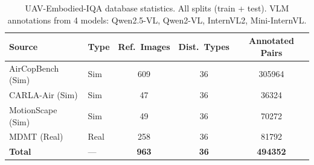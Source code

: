 \begin{table}[t]
\centering
\small
\setlength{\tabcolsep}{4pt}
\caption{UAV-Embodied-IQA database statistics. All splits (train + test). VLM annotations from 4 models: Qwen2.5-VL, Qwen2-VL, InternVL2, Mini-InternVL.}
\label{tab:db_stats}
\begin{tabular}{llccc}
\toprule
\textbf{Source} & \textbf{Type} & \textbf{Ref.\ Images} & \textbf{Dist.\ Types} & \textbf{Annotated Pairs} \\
\midrule
AirCopBench (Sim) & Sim & 609 & 36 & 305964 \\
CARLA-Air (Sim) & Sim & 47 & 36 & 36324 \\
MotionScape (Sim) & Sim & 49 & 36 & 70272 \\
MDMT (Real) & Real & 258 & 36 & 81792 \\
\midrule
\textbf{Total} & --- & \textbf{963} & \textbf{36} & \textbf{494352} \\
\bottomrule
\end{tabular}
\end{table}
